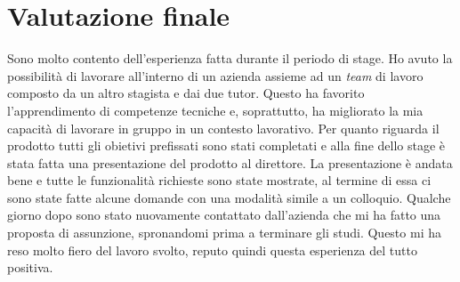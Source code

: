 \section{Valutazione finale}
Sono molto contento dell'esperienza fatta durante il periodo di stage. Ho avuto la possibilità di lavorare all'interno di un azienda assieme ad un \textit{team} di lavoro composto da un altro stagista e dai due tutor. Questo ha favorito l'apprendimento di competenze tecniche e, soprattutto, ha migliorato la mia capacità di lavorare in gruppo in un contesto lavorativo. Per quanto riguarda il prodotto tutti gli obietivi prefissati sono stati completati e alla fine dello stage è stata fatta una presentazione del prodotto al direttore. La presentazione è andata bene e tutte le funzionalità richieste sono state mostrate, al termine di essa ci sono state fatte alcune domande con una modalità simile a un colloquio. Qualche giorno dopo sono stato nuovamente contattato dall'azienda che mi ha fatto una proposta di assunzione, spronandomi prima a terminare gli studi. Questo mi ha reso molto fiero del lavoro svolto, reputo quindi questa esperienza del tutto positiva.
